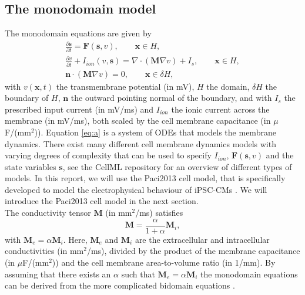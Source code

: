 \documentclass{article}
\begin{document}
\subsection{The monodomain model} \label{The monodomain model}
The monodomain equations are given by 
\begin{eqnarray} \label{eq:a}
\frac{\partial \mathbf{s}}{\partial t}= \mathbf{F}(\mathbf{s},v), \qquad \mathbf{x} \in H, \\
\frac{\partial v}{\partial t} + I_{ion}(v,\mathbf{s}) =\nabla \label{eq:b} \cdot(\mathbf{M}\nabla v) + I_s,\qquad \mathbf{x} \in H, \\ \label{eq:c}
\mathbf{n}\cdot (\mathbf{M}\nabla v)=0, \qquad \mathbf{x} \in \delta H,
\end{eqnarray}
with $v(\mathbf{x},t)$ the transmembrane potential (in mV), $H$ the domain, $\delta H$ the boundary of $H$, $\mathbf{n}$ the outward pointing normal of the boundary, and with $I_s$ the prescribed input current (in mV/ms) and $I_{ion}$ the ionic current across the membrane (in mV/ms), both scaled by the cell membrane capacitance (in $\mu$F/(mm$^2$)). 
Equation \eqref{eq:a} is a system of ODEs that models the membrane dynamics. There exist many different cell membrane dynamics models with varying degrees of complexity that can be used to specify $I_{ion}$, $\mathbf{F}(\mathbf{s},v)$ and the state variables $\mathbf{s}$, see the CellML repository \cite{cellml} for an overview of different types of models. In this report, we will use the Paci2013 cell model, that is specifically developed to model the electrophysical behaviour of iPSC-CMs \cite{Paci2013}. We will introduce the Paci2013 cell model in the next section.\\ The conductivity tensor $\mathbf{M}$ (in mm$^2$/ms) satisfies 
\begin{equation}
\mathbf{M}=\frac{\alpha}{1+\alpha}\mathbf{M}_i,\label{eq:d}
\end{equation}
with $\mathbf{M}_e=\alpha \mathbf{M}_i$. Here, $\mathbf{M}_e$ and $\mathbf{M}_i$ are the extracellular and intracellular conductivities (in mm$^2$/ms), divided by the product of the membrane capacitance (in $\mu$F/(mm$^2$)) and the cell membrane area-to-volume ratio (in 1/mm). By assuming that there exists an $\alpha$ such that $\mathbf{M}_e=\alpha \mathbf{M}_i$ the monodomain equations can be derived from the more complicated bidomain equations \cite[p. 566-568]{KeenerI}.
%
\end{document}
